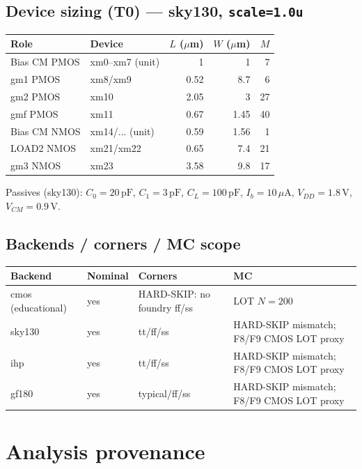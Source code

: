 \documentclass[11pt]{article}
\begin{document}
\subsection{Device sizing (T0) --- sky130, \texttt{scale=1.0u}}
\begin{center}
{\small
\begin{tabular}{@{}llrrr@{}}
\toprule
Role & Device & $L$ ($\mu$m) & $W$ ($\mu$m) & $M$ \\
\midrule
Bias CM PMOS & xm0--xm7 (unit) & 1 & 1 & 7 \\
gm1 PMOS & xm8/xm9 & 0.52 & 8.7 & 6 \\
gm2 PMOS & xm10 & 2.05 & 3 & 27 \\
gmf PMOS & xm11 & 0.67 & 1.45 & 40 \\
Bias CM NMOS & xm14/... (unit) & 0.59 & 1.56 & 1 \\
LOAD2 NMOS & xm21/xm22 & 0.65 & 7.4 & 21 \\
gm3 NMOS & xm23 & 3.58 & 9.8 & 17 \\
\bottomrule
\end{tabular}}
\end{center}
Passives (sky130): $C_0{=}20\,\mathrm{pF}$, $C_1{=}3\,\mathrm{pF}$, $C_L{=}100\,\mathrm{pF}$,
$I_b{=}10\,\mu\mathrm{A}$, $V_{DD}{=}1.8\,\mathrm{V}$, $V_{CM}{=}0.9\,\mathrm{V}$.

\subsection{Backends / corners / MC scope}
\begin{center}
{\small
\begin{tabular}{@{}llll@{}}
\toprule
Backend & Nominal & Corners & MC \\
\midrule
cmos (educational) & yes & HARD-SKIP: no foundry ff/ss & LOT $N{=}200$ \\
sky130 & yes & tt/ff/ss & HARD-SKIP mismatch; F8/F9 CMOS LOT proxy \\
ihp & yes & tt/ff/ss & HARD-SKIP mismatch; F8/F9 CMOS LOT proxy \\
gf180 & yes & typical/ff/ss & HARD-SKIP mismatch; F8/F9 CMOS LOT proxy \\
\bottomrule
\end{tabular}}
\end{center}

\section{Analysis provenance}
\end{document}
